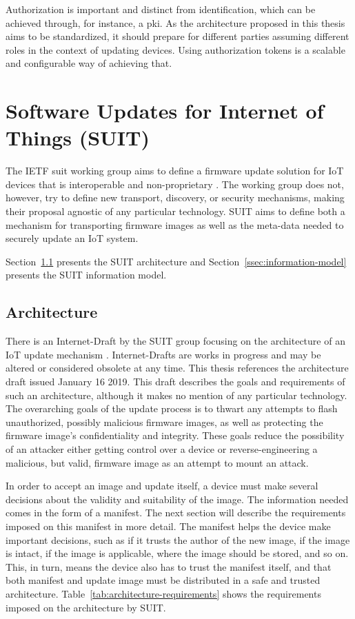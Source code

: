 \documentclass[0-thesis.tex]{subfiles}
\begin{document}
Authorization is important and distinct from identification, which can be achieved
through, for instance, a \gls{pki}. As the architecture proposed in this thesis aims to be
standardized, it should prepare for different parties assuming different roles in the
context of updating devices. Using authorization tokens is a scalable and configurable way
of achieving that.

\section{Software Updates for Internet of Things (SUIT)}
\label{sec:suit}
The IETF \acrfull{suit} working group aims to define a firmware update solution for IoT
devices that is interoperable and non-proprietary \parencite{suit}. The working group does
not, however, try to define new transport, discovery, or security mechanisms, making their
proposal agnostic of any particular technology. SUIT aims to define both a mechanism for
transporting firmware images as well as the meta-data needed to securely update an IoT
system.

Section~\ref{ssec:architecture} presents the SUIT architecture and
Section~\ref{ssec:information-model} presents the SUIT information model.

\subsection{Architecture}
\label{ssec:architecture}
There is an Internet-Draft by the SUIT group focusing on the architecture of an IoT update
mechanism \parencite{suit-architecture}. Internet-Drafts are works in progress and may be
altered or considered obsolete at any time. This thesis references the architecture draft
issued January 16 2019. This draft describes the goals and requirements of such an
architecture, although it makes no mention of any particular technology. The overarching
goals of the update process is to thwart any attempts to flash unauthorized, possibly
malicious firmware images, as well as protecting the firmware image's confidentiality and
integrity. These goals reduce the possibility of an attacker either getting control over
a device or reverse-engineering a malicious, but valid, firmware image as an attempt to
mount an attack.

In order to accept an image and update itself, a device must make several decisions about
the validity and suitability of the image. The information needed comes in the form of a
manifest. The next section will describe the requirements imposed on this manifest in
more detail. The manifest helps the device make important decisions, such as if it trusts
the author of the new image, if the image is intact, if the image is applicable, where the
image should be stored, and so on. This, in turn, means the device also has to trust the
manifest itself, and that both manifest and update image must be distributed in a safe and
trusted architecture. Table~\ref{tab:architecture-requirements} shows the requirements
imposed on the architecture by SUIT.
\end{document}
